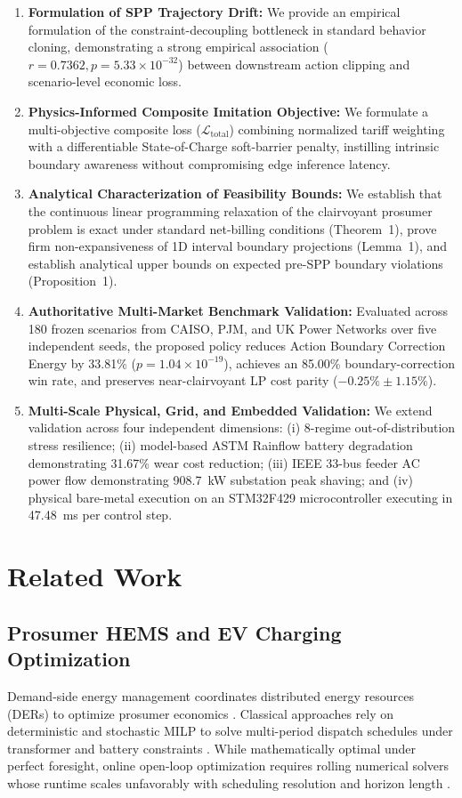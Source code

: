 \documentclass[journal]{IEEEtran}
\theoremstyle{remark}
\begin{document}
\begin{enumerate}
    \item \textbf{Formulation of SPP Trajectory Drift:} We provide an empirical formulation of the constraint-decoupling bottleneck in standard behavior cloning, demonstrating a strong empirical association ($r = 0.7362, p = 5.33 \times 10^{-32}$) between downstream action clipping and scenario-level economic loss.
    \item \textbf{Physics-Informed Composite Imitation Objective:} We formulate a multi-objective composite loss ($\mathcal{L}_{\mathrm{total}}$) combining normalized tariff weighting with a differentiable State-of-Charge soft-barrier penalty, instilling intrinsic boundary awareness without compromising edge inference latency.
    \item \textbf{Analytical Characterization of Feasibility Bounds:} We establish that the continuous linear programming relaxation of the clairvoyant prosumer problem is exact under standard net-billing conditions (Theorem~1), prove firm non-expansiveness of 1D interval boundary projections (Lemma~1), and establish analytical upper bounds on expected pre-SPP boundary violations (Proposition~1).
    \item \textbf{Authoritative Multi-Market Benchmark Validation:} Evaluated across 180 frozen scenarios from CAISO, PJM, and UK Power Networks over five independent seeds, the proposed policy reduces Action Boundary Correction Energy by 33.81\% ($p = 1.04 \times 10^{-19}$), achieves an 85.00\% boundary-correction win rate, and preserves near-clairvoyant LP cost parity ($-0.25\% \pm 1.15\%$).
    \item \textbf{Multi-Scale Physical, Grid, and Embedded Validation:} We extend validation across four independent dimensions: (i) 8-regime out-of-distribution stress resilience; (ii) model-based ASTM Rainflow battery degradation demonstrating 31.67\% wear cost reduction; (iii) IEEE 33-bus feeder AC power flow demonstrating 908.7~kW substation peak shaving; and (iv) physical bare-metal execution on an STM32F429 microcontroller executing in 47.48~ms per control step.
\end{enumerate}

\section{Related Work}
\subsection{Prosumer HEMS and EV Charging Optimization}
Demand-side energy management coordinates distributed energy resources (DERs) to optimize prosumer economics \cite{richardson2012}. Classical approaches rely on deterministic and stochastic MILP to solve multi-period dispatch schedules under transformer and battery constraints \cite{franco2015, zheng2019}. While mathematically optimal under perfect foresight, online open-loop optimization requires rolling numerical solvers whose runtime scales unfavorably with scheduling resolution and horizon length \cite{shi2019, toubeau2022}.
\end{document}
